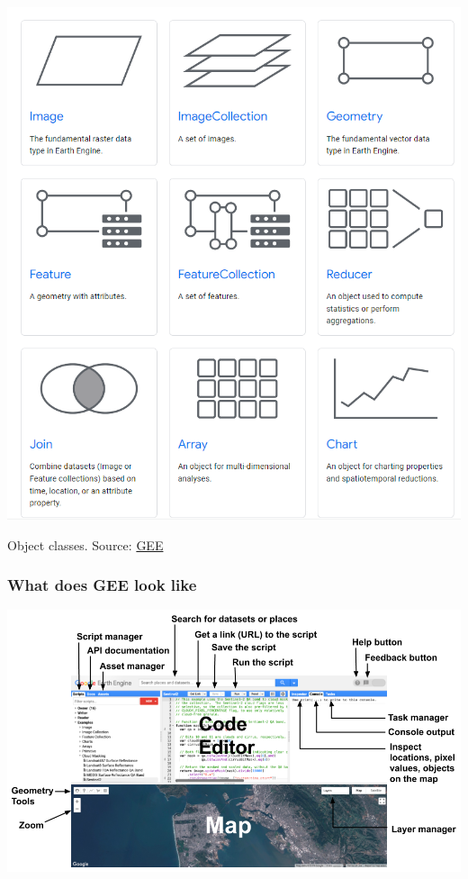 \documentclass[
  letterpaper,
  DIV=11,
  numbers=noendperiod]{scrreprt}
\begin{document}
\includegraphics{./images/paste-313B53C6.png}

Object classes. Source:
\href{https://developers.google.com/earth-engine/guides/objects_methods_overview}{GEE}

\hypertarget{what-does-gee-look-like}{%
\subsubsection{What does GEE look like}\label{what-does-gee-look-like}}

\includegraphics{./images/paste-59C13A06.png}
\end{document}
